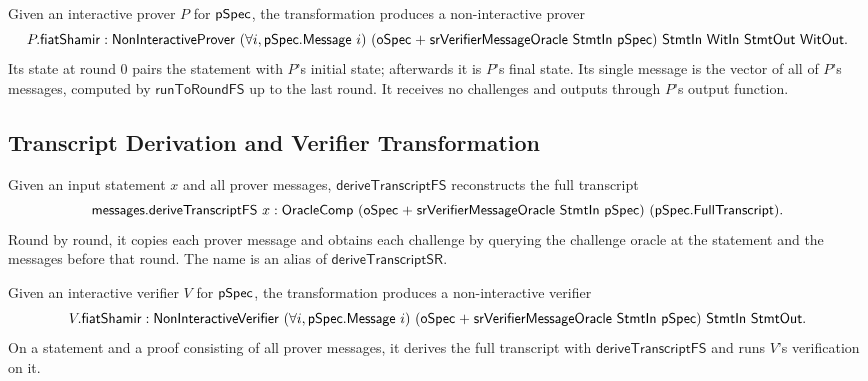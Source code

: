 \begin{definition}
    \label{def:prover_fiat_shamir}
    Given an interactive prover $P$ for $\mathsf{pSpec}$, the transformation produces a non-interactive
    prover
    \[ P.\mathsf{fiatShamir} : \NonInteractiveProver\ (\forall i, \pSpec.\Message\ i)\ (\oSpec \mathrel{+} \mathsf{srVerifierMessageOracle}\ \StmtIn\ \pSpec)\ \StmtIn\ \WitIn\ \StmtOut\ \WitOut . \]
    Its state at round $0$ pairs the statement with $P$'s initial state; afterwards it is $P$'s
    final state. Its single message is the vector of all of $P$'s messages, computed by
    $\mathsf{runToRoundFS}$ up to the last round. It receives no challenges and outputs through
    $P$'s output function.
    \leanok
\end{definition}

\subsection{Transcript Derivation and Verifier Transformation}\label{sec:fiat_shamir_verifier}

\begin{definition}
    \label{def:derive_transcript_fs}
    Given an input statement $x$ and all prover messages, $\mathsf{deriveTranscriptFS}$
    reconstructs the full transcript
    \[ \mathsf{messages}.\mathsf{deriveTranscriptFS}\ x : \OracleComp\ (\oSpec \mathrel{+} \mathsf{srVerifierMessageOracle}\ \StmtIn\ \pSpec)\ (\pSpec.\FullTranscript) . \]
    Round by round, it copies each prover message and obtains each challenge by querying the
    challenge oracle at the statement and the messages before that round. The name is an alias of
    $\mathsf{deriveTranscriptSR}$.
    \leanok
\end{definition}

\begin{definition}
    \label{def:verifier_fiat_shamir}
    Given an interactive verifier $V$ for $\mathsf{pSpec}$, the transformation produces a non-interactive
    verifier
    \[ V.\mathsf{fiatShamir} : \NonInteractiveVerifier\ (\forall i, \pSpec.\Message\ i)\ (\oSpec \mathrel{+} \mathsf{srVerifierMessageOracle}\ \StmtIn\ \pSpec)\ \StmtIn\ \StmtOut . \]
    On a statement and a proof consisting of all prover messages, it derives the full transcript
    with $\mathsf{deriveTranscriptFS}$ and runs $V$'s verification on it.
    \leanok
\end{definition}

